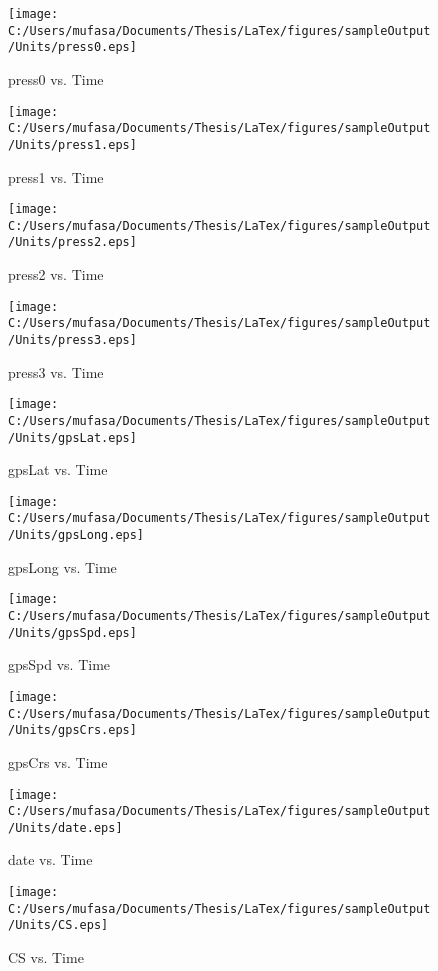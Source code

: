 \begin{figure}[]
	\centering
	\caption{press0 vs. Time}
		\texttt{[image: C:/Users/mufasa/Documents/Thesis/LaTex/figures/sampleOutput/Units/press0.eps]}
\end{figure}
\begin{figure}[]
	\centering
	\caption{press1 vs. Time}
		\texttt{[image: C:/Users/mufasa/Documents/Thesis/LaTex/figures/sampleOutput/Units/press1.eps]}
\end{figure}
\begin{figure}[]
	\centering
	\caption{press2 vs. Time}
		\texttt{[image: C:/Users/mufasa/Documents/Thesis/LaTex/figures/sampleOutput/Units/press2.eps]}
\end{figure}
\begin{figure}[]
	\centering
	\caption{press3 vs. Time}
		\texttt{[image: C:/Users/mufasa/Documents/Thesis/LaTex/figures/sampleOutput/Units/press3.eps]}
\end{figure}
\begin{figure}[]
	\centering
	\caption{gpsLat vs. Time}
		\texttt{[image: C:/Users/mufasa/Documents/Thesis/LaTex/figures/sampleOutput/Units/gpsLat.eps]}
\end{figure}
\begin{figure}[]
	\centering
	\caption{gpsLong vs. Time}
		\texttt{[image: C:/Users/mufasa/Documents/Thesis/LaTex/figures/sampleOutput/Units/gpsLong.eps]}
\end{figure}
\begin{figure}[]
	\centering
	\caption{gpsSpd vs. Time}
		\texttt{[image: C:/Users/mufasa/Documents/Thesis/LaTex/figures/sampleOutput/Units/gpsSpd.eps]}
\end{figure}
\begin{figure}[]
	\centering
	\caption{gpsCrs vs. Time}
		\texttt{[image: C:/Users/mufasa/Documents/Thesis/LaTex/figures/sampleOutput/Units/gpsCrs.eps]}
\end{figure}
\begin{figure}[]
	\centering
	\caption{date vs. Time}
		\texttt{[image: C:/Users/mufasa/Documents/Thesis/LaTex/figures/sampleOutput/Units/date.eps]}
\end{figure}
\begin{figure}[]
	\centering
	\caption{CS vs. Time}
		\texttt{[image: C:/Users/mufasa/Documents/Thesis/LaTex/figures/sampleOutput/Units/CS.eps]}
\end{figure}
